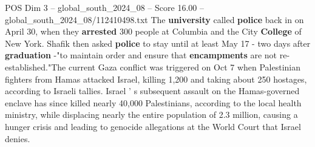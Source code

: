 \begin{textsample}{POS Dim 3 – global\_south\_2024\_08 – Score 16.00 – global\_south\_2024\_08/112410498.txt}
The \textbf{university} called \textbf{police} back in on April 30, when they \textbf{arrested} 300 people at Columbia and the City \textbf{College} of New York.
Shafik then asked \textbf{police} to stay until at least May 17 - two days after \textbf{graduation} -"to maintain order and ensure that \textbf{encampments} are not re-established."The current Gaza conflict was triggered on Oct 7 when Palestinian fighters from Hamas attacked Israel, killing 1,200 and taking about 250 hostages, according to Israeli tallies.
Israel ' s subsequent assault on the Hamas-governed enclave has since killed nearly 40,000 Palestinians, according to the local health ministry, while displacing nearly the entire population of 2.3 million, causing a hunger crisis and leading to genocide allegations at the World Court that Israel denies.

\end{textsample}
